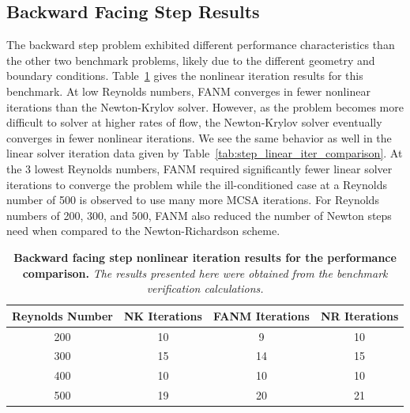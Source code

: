 \clearpage

\subsection{Backward Facing Step Results}
\label{subsec:backward_step_comparison}

The backward step problem exhibited different performance
characteristics than the other two benchmark problems, likely due to
the different geometry and boundary
conditions. Table~\ref{tab:step_nonlinear_iter_comparison} gives the
nonlinear iteration results for this benchmark. At low Reynolds
numbers, FANM converges in fewer nonlinear iterations than the
Newton-Krylov solver. However, as the problem becomes more difficult
to solver at higher rates of flow, the Newton-Krylov solver eventually
converges in fewer nonlinear iterations. We see the same behavior as
well in the linear solver iteration data given by
Table~\ref{tab:step_linear_iter_comparison}. At the 3 lowest Reynolds
numbers, FANM required significantly fewer linear solver iterations to
converge the problem while the ill-conditioned case at a Reynolds
number of 500 is observed to use many more MCSA iterations. For
Reynolds numbers of 200, 300, and 500, FANM also reduced the number of
Newton steps need when compared to the Newton-Richardson scheme.

\begin{table}[h!]
  \begin{center}
    \begin{tabular}{cccc}\hline\hline
      \multicolumn{1}{c}{Reynolds Number}& 
      \multicolumn{1}{c}{NK Iterations}&
      \multicolumn{1}{c}{FANM Iterations}&
      \multicolumn{1}{c}{NR Iterations}\\
      \hline
      200 & 10 & 9 & 10\\
      300 & 15 & 14 & 15\\
      400 & 10 & 10 & 10\\
      500 & 19 & 20 & 21\\
      \hline\hline
    \end{tabular}
  \end{center}
  \caption{\textbf{Backward facing step nonlinear iteration
      results for the performance comparison.} \textit{The results
      presented here were obtained from the benchmark verification
      calculations.}}
  \label{tab:step_nonlinear_iter_comparison}
\end{table}

